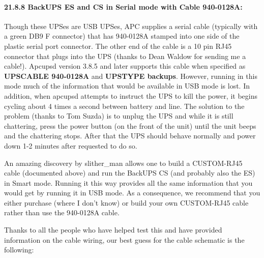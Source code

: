 \label{BackUPS-ES-and-CS-in-Serial-mode-with-Cable-940_002d0128A}

\paragraph*{21.8.8 BackUPS ES and CS in Serial mode with Cable 940-0128A:}

\label{index-BackUPS-ES-211}
\label{index-Cables-212}
Though these UPSes are USB UPSes, APC supplies a serial cable (typically with
a green DB9 F connector) that has 940-0128A stamped into one side of the
plastic serial port connector. The other end of the cable is a 10 pin RJ45
connector that plugs into the UPS (thanks to Dean Waldow for sending me a
cable!). Apcupsd version 3.8.5 and later supports this cable when specified as
{\bf UPSCABLE 940-0128A} and {\bf UPSTYPE backups}. However, running in this
mode much of the information that would be available in USB mode is lost. In
addition, when apcupsd attempts to instruct the UPS to kill the power, it
begins cycling about 4 times a second between battery and line. The solution
to the problem (thanks to Tom Suzda) is to unplug the UPS and while it is
still chattering, press the power button (on the front of the unit) until the
unit beeps and the chattering stops. After that the UPS should behave normally
and power down 1-2 minutes after requested to do so.  

An amazing discovery by slither\_man allows one to build a CUSTOM-RJ45 cable
(documented above) and run the BackUPS CS (and probably also the ES) in Smart
mode. Running it this way provides all the same information that you would get
by running it in USB mode. As a consequence, we recommend that you either
purchase (where I don't know) or build your own CUSTOM-RJ45 cable rather than
use the 940-0128A cable.  

Thanks to all the people who have helped test this and have provided
information on the cable wiring, our best guess for the cable schematic is the
following: 

